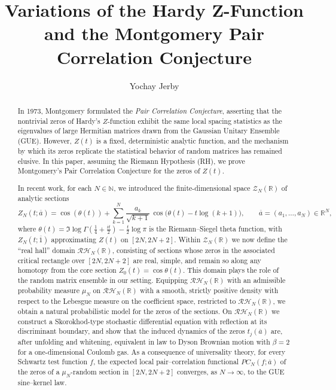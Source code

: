 \documentclass[12pt,reqno]{amsart}
\title[Variations of $Z(t)$ and the Montgomery Pair Correlation Conjecture]{Variations of the Hardy Z-Function and the Montgomery Pair Correlation Conjecture}
\author{Yochay Jerby}
\date{}
\theoremstyle{plain}
\theoremstyle{definition}
\theoremstyle{remark}
\begin{document}
\maketitle
\begin{abstract}

In 1973, Montgomery formulated the \emph{Pair Correlation Conjecture}, asserting that the nontrivial zeros of Hardy’s \(Z\)-function exhibit the same local spacing statistics as the eigenvalues of large Hermitian matrices drawn from the Gaussian Unitary Ensemble (GUE). However, \(Z(t)\) is a fixed, deterministic analytic function, and the mechanism by which its zeros replicate the statistical behavior of random matrices has remained elusive. In this paper, assuming the Riemann Hypothesis (RH), we prove Montgomery’s Pair Correlation Conjecture for the zeros of \(Z(t)\).

In recent work, for each \(N \in \mathbb{N}\), we introduced the finite-dimensional space \(\mathcal{Z}_N (\mathbb{R})\) of analytic sections
\[
Z_{N}(t;\overline{a})
=
\cos(\theta(t))
+\sum_{k=1}^{N}\frac{a_{k}}{\sqrt{k+1}}\,
\cos\!\bigl(\theta(t)-t\log(k+1)\bigr),
\qquad 
\overline{a}=(a_1,\dots,a_N)\in\mathbb{R}^N,
\]
where
\(\theta(t) = \Im\log \Gamma\!\left(\tfrac14 + \tfrac{i t}{2}\right) - \tfrac{t}{2} \log \pi\)
is the Riemann--Siegel theta function, with \(Z_N(t; \overline{1})\) approximating \(Z(t)\) on \([2N,2N+2]\). Within \(\mathcal{Z}_N(\mathbb{R})\) we now define the “real hall” domain \(\mathcal{RH}_N(\mathbb{R})\), consisting of sections whose zeros in the associated critical rectangle over $[2N,2N+2]$ are real, simple, and remain so along any homotopy from the core section \(Z_0(t)=\cos\theta(t)\). This domain plays the role of the random matrix ensemble in our setting. Equipping \(\mathcal{RH}_N(\mathbb{R})\) with an admissible probability measure $\mu_N$ on
$\mathcal{RH}_N(\mathbb{R})$ with a smooth, strictly positive density
with respect to the Lebesgue measure on the coefficient space, restricted
to $\mathcal{RH}_N(\mathbb{R})$, we obtain a natural probabilistic model for the zeros of the sections. On \(\mathcal{RH}_N(\mathbb{R})\) we construct a Skorokhod-type stochastic differential equation with reflection at its discriminant boundary, and show that the induced dynamics of the zeros \(t_j(\overline{a})\) are, after unfolding and whitening, equivalent in law to Dyson Brownian motion with \(\beta=2\) for a one-dimensional Coulomb gas. As a consequence of universality theory, for every Schwartz test function \(f\), the expected local pair–correlation functional \(PC_N(f;\overline{a})\) of the zeros of a \(\mu_N\)-random section in \([2N,2N+2]\) converges, as \(N\to\infty\), to the GUE sine–kernel law.


\end{abstract}
\end{document}
